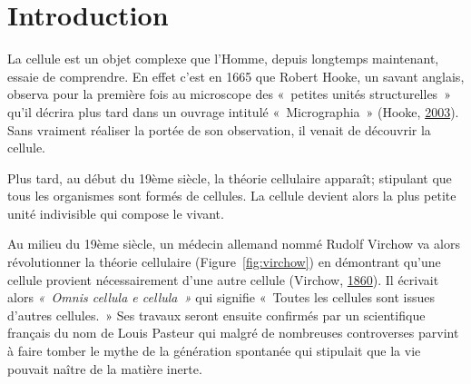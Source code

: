 \documentclass[12pt,a4paper,twoside,openright]{book}
\begin{document}
\clearpage\null
\mainmatter

\chapter{Introduction}\label{introduction}

La cellule est un objet complexe que l'Homme, depuis longtemps
maintenant, essaie de comprendre. En effet c'est en 1665 que Robert
Hooke, un savant anglais, observa pour la première fois au microscope
des «~petites unités structurelles~» qu'il décrira plus tard dans un
ouvrage intitulé «~Micrographia~» (Hooke,
\protect\hyperlink{ref-hooke2003micrographia}{2003}). Sans vraiment
réaliser la portée de son observation, il venait de découvrir la
cellule.

Plus tard, au début du 19ème siècle, la théorie cellulaire apparaît;
stipulant que tous les organismes sont formés de cellules. La cellule
devient alors la plus petite unité indivisible qui compose le vivant.

Au milieu du 19ème siècle, un médecin allemand nommé Rudolf Virchow va
alors révolutionner la théorie cellulaire (Figure~\ref{fig:virchow}) en
démontrant qu'une cellule provient nécessairement d'une autre cellule
(Virchow, \protect\hyperlink{ref-virchow1860cellular}{1860}). Il
écrivait alors \emph{«~Omnis cellula e cellula~»} qui signifie «~Toutes
les cellules sont issues d'autres cellules.~» Ses travaux seront ensuite
confirmés par un scientifique français du nom de Louis Pasteur qui
malgré de nombreuses controverses parvint à faire tomber le mythe de la
génération spontanée qui stipulait que la vie pouvait naître de la
matière inerte.
\end{document}
